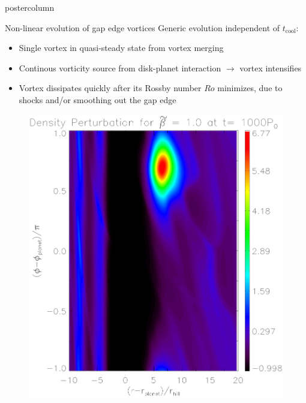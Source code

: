 \documentclass[final,hyperref={pdfpagelabels=false}]{beamer}
\begin{document}
\begin{frame}
\begin{columns}
\begin{column}{.49\textwidth}
\begin{beamercolorbox}[center,wd=\textwidth]{postercolumn}
\begin{minipage}[T]{.95\textwidth}
{            \begin{block}{\Large{Non-linear evolution of gap edge
                  vortices}}
              \justifying
              Generic evolution independent of $t_\mathrm{cool}$:
              \begin{itemize}
              \item Single vortex in quasi-steady state from vortex merging
              \item Continous vorticity source from disk-planet interaction
                $\to$ vortex intensifies
              \item Vortex dissipates quickly after its Rossby number
                $Ro$ minimizes, due to shocks and/or smoothing out the
                gap edge  
              \end{itemize}
                  \begin{figure}
                    \centering
                    \hfill
                    \begin{minipage}{0.3\textwidth}
                      \includegraphics[width=\textwidth]{Posterfig_Before}

\end{minipage}
\end{figure}
\end{block}}
\end{minipage}
\end{beamercolorbox}
\end{column}
\end{columns}
\end{frame}
\end{document}
